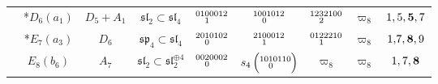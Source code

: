 \documentclass{amsart}
\theoremstyle{definition}
\newcommand{\0}{\mathcal{O}}
\begin{document}
\begin{table}[htp]
\begin{center}
\begin{tabular}{|c | c| c| c| c| c| c|c | c|}
				& *$D_6(a_1)$ & $D_5+A_1$ & $\mathfrak{sl}_2\subset\mathfrak{sl}_4$ & $\scriptsize{\begin{aligned}01 &00012 \\[-1.8mm] &1\end{aligned}}$ & $\scriptsize{\begin{aligned}10 &01012 \\[-1.8mm] &0\end{aligned}}$ 
                & $\scriptsize{\begin{aligned}1 2 &32100 \\[-1.8mm] &2\end{aligned}}$ 
                &  $\varpi_8$ 
                & $1,5, {\bf 5},7$ \\
				
            & *$E_7(a_3)$ & $D_6$ & $\mathfrak{sp}_4\subset\mathfrak{sl}_4$ & $\scriptsize{\begin{aligned}20 &10102 \\[-1.8mm] &0\end{aligned}}$ & $\scriptsize{\begin{aligned}21 &00012 \\[-1.8mm] &1\end{aligned}}$ 
            & $\scriptsize{\begin{aligned}0 1 &22210 \\[-1.8mm] &1\end{aligned}}$ &  $\varpi_8$ 
            & $\tiny{1,\!7, {\bf 8},9}$ \\

	           & $E_8(b_6)$ & $A_7$ & $\mathfrak{sl}_2\subset \mathfrak{sl}_2^{\oplus 4}$ & $\scriptsize{\begin{aligned}00 &20002 \\[-1.8mm] &0\end{aligned}}$ & $s_4\left(\scriptsize{\begin{aligned}10 &10110 \\[-1.8mm] &0\end{aligned}}\right)$ 
               & $\varpi_8$ & $\varpi_8$ 
               & $1,7, {\bf 8}$ \\


\end{tabular}
\end{center}
\end{table}
\end{document}

